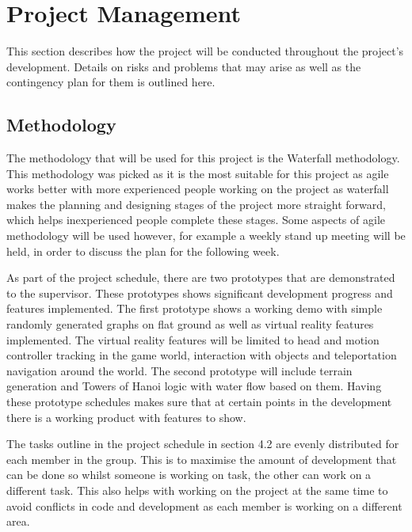 \chapter{Project Management}
\label{chapter4}

This section describes how the project will be conducted throughout the project's development. Details on risks and problems that may arise as well as the contingency plan for them is outlined here.

\section{Methodology}
The methodology that will be used for this project is the Waterfall methodology. This methodology was picked as it is the most suitable for this project as agile works better with more experienced people working on the project as waterfall makes the planning and designing stages of the project more straight forward, which helps inexperienced people complete these stages. Some aspects of agile methodology will be used however, for example a weekly stand up meeting will be held, in order to discuss the plan for the following week. 
\newline
\par
As part of the project schedule, there are two prototypes that are demonstrated to the supervisor. These prototypes shows significant development progress and features implemented. The first prototype shows a working demo with simple randomly generated graphs on flat ground as well as virtual reality features implemented. The virtual reality features will be limited to head and motion controller tracking in the game world, interaction with objects and teleportation navigation around the world. The second prototype will include terrain generation and Towers of Hanoi logic with water flow based on them. Having these prototype schedules makes sure that at certain points in the development there is a working product with features to show.
\newline
\par
The tasks outline in the project schedule in section 4.2 are evenly distributed for each member in the group. This is to maximise the amount of development that can be done so whilst someone is working on task, the other can work on a different task. This also helps with working on the project at the same time to avoid conflicts in code and development as each member is working on a different area.
